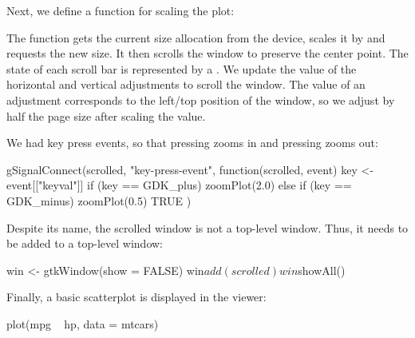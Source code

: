 Next, we define a function for scaling the plot:
\begin{Schunk}
\end{Schunk}
%
The function gets the current size allocation from the device, scales
it by  and requests the new size. It then scrolls the window
to preserve the center point. The state of each scroll bar is
represented by a .  We update the value of
the horizontal and vertical adjustments to scroll the window.  The
value of an adjustment corresponds to the left/top position of the
window, so we adjust by half the page size after scaling the value.

We had key press events, so that pressing \kbd{+} zooms in and
pressing \kbd{-} zooms out:
\begin{Schunk}
\begin{Sinput}
 gSignalConnect(scrolled, "key-press-event", 
                function(scrolled, event) {
                  key <- event[["keyval"]]
                  if (key == GDK_plus)
                    zoomPlot(2.0)
                  else if (key == GDK_minus)
                    zoomPlot(0.5)
                  TRUE
                })
\end{Sinput}
\end{Schunk}

Despite its name, the scrolled window is not a top-level window. Thus,
it needs to be added to a top-level window:
\begin{Schunk}
\begin{Sinput}
 win <- gtkWindow(show = FALSE)
 win$add(scrolled)
 win$showAll()
\end{Sinput}
\end{Schunk}
 
Finally, a basic scatterplot is displayed in the viewer:
\begin{Schunk}
\begin{Sinput}
 plot(mpg ~ hp, data = mtcars)
\end{Sinput}
\end{Schunk}

